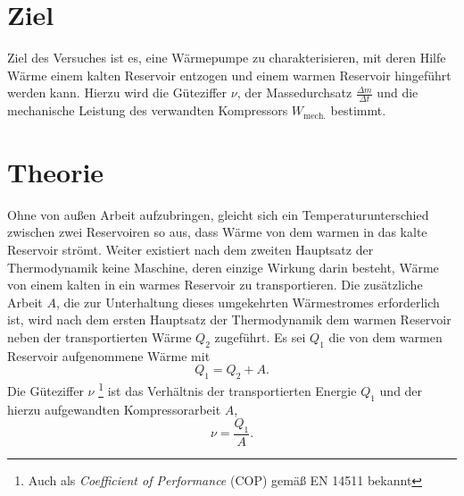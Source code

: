 \section{Ziel}
\label{sec:Ziel}
Ziel des Versuches ist es, eine Wärmepumpe zu charakterisieren, mit deren Hilfe Wärme einem kalten Reservoir entzogen und einem warmen Reservoir hingeführt werden kann.
Hierzu wird die Güteziffer $\nu$, der Massedurchsatz $\frac{\Delta{m}}{\Delta{t}}$ und die mechanische Leistung des verwandten Kompressors $W_\text{mech.}$ bestimmt.
\section{Theorie}
\label{sec:Theorie}
Ohne von außen Arbeit aufzubringen, gleicht sich ein Temperaturunterschied zwischen zwei Reservoiren so aus, 
dass Wärme von dem warmen in das kalte Reservoir strömt.
Weiter existiert nach dem zweiten Hauptsatz der Thermodynamik keine Maschine, deren einzige Wirkung darin besteht, Wärme von einem kalten in ein warmes Reservoir zu transportieren\cite{hauptsaetzederthermodynamik}.
Die zusätzliche Arbeit $A$, die zur Unterhaltung dieses umgekehrten Wärmestromes erforderlich ist, wird nach dem ersten Hauptsatz der Thermodynamik dem warmen Reservoir neben der transportierten Wärme $Q_2$ %
zugeführt.
Es sei $Q_1$ die von dem warmen Reservoir aufgenommene Wärme mit
\begin{equation}
	Q_1 = Q_2+A.
	\label{eq:waermetransport}
\end{equation}
Die Güteziffer $\nu$ \footnote{Auch als \textit{Coefficient of Performance} (COP) gemäß EN 14511 bekannt} ist das Verhältnis der transportierten Energie $Q_1$ und der hierzu aufgewandten Kompressorarbeit $A$,
\begin{equation}
	\nu = \frac{Q_1}{A}.
	\label{eq:gueteziffer}
\end{equation}

